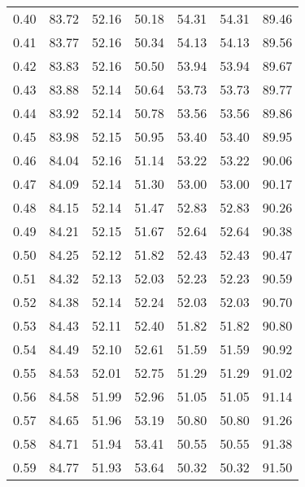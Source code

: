 \begin{tabular}{|c|c|c|c|c|c|c|}
      0.40 &     83.72 &     52.16 &      50.18 &   54.31 &      54.31 &         89.46 \\
      0.41 &     83.77 &     52.16 &      50.34 &   54.13 &      54.13 &         89.56 \\
      0.42 &     83.83 &     52.16 &      50.50 &   53.94 &      53.94 &         89.67 \\
      0.43 &     83.88 &     52.14 &      50.64 &   53.73 &      53.73 &         89.77 \\
      0.44 &     83.92 &     52.14 &      50.78 &   53.56 &      53.56 &         89.86 \\
      0.45 &     83.98 &     52.15 &      50.95 &   53.40 &      53.40 &         89.95 \\
      0.46 &     84.04 &     52.16 &      51.14 &   53.22 &      53.22 &         90.06 \\
      0.47 &     84.09 &     52.14 &      51.30 &   53.00 &      53.00 &         90.17 \\
      0.48 &     84.15 &     52.14 &      51.47 &   52.83 &      52.83 &         90.26 \\
      0.49 &     84.21 &     52.15 &      51.67 &   52.64 &      52.64 &         90.38 \\
      0.50 &     84.25 &     52.12 &      51.82 &   52.43 &      52.43 &         90.47 \\
      0.51 &     84.32 &     52.13 &      52.03 &   52.23 &      52.23 &         90.59 \\
      0.52 &     84.38 &     52.14 &      52.24 &   52.03 &      52.03 &         90.70 \\
      0.53 &     84.43 &     52.11 &      52.40 &   51.82 &      51.82 &         90.80 \\
      0.54 &     84.49 &     52.10 &      52.61 &   51.59 &      51.59 &         90.92 \\
      0.55 &     84.53 &     52.01 &      52.75 &   51.29 &      51.29 &         91.02 \\
      0.56 &     84.58 &     51.99 &      52.96 &   51.05 &      51.05 &         91.14 \\
      0.57 &     84.65 &     51.96 &      53.19 &   50.80 &      50.80 &         91.26 \\
      0.58 &     84.71 &     51.94 &      53.41 &   50.55 &      50.55 &         91.38 \\
      0.59 &     84.77 &     51.93 &      53.64 &   50.32 &      50.32 &         91.50 \\

\end{tabular}
